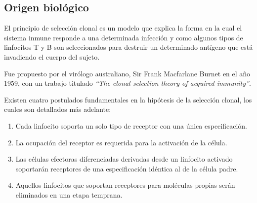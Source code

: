 
\subsection{Origen biológico}

El principio de selección clonal es un modelo que explica la forma en la cual el sistema inmune
responde a una determinada infección y como algunos tipos de linfocitos T y B son seleccionados
para destruir un determinado antígeno que está invadiendo el cuerpo del sujeto.

Fue propuesto por el virólogo australiano, Sir Frank Macfarlane Burnet en el año 1959,
con un trabajo titulado \emph{``The clonal selection theory of acquired immunity''}.

Existen cuatro postulados fundamentales en la hipótesis de la selección clonal, los cuales son detallados más adelante:
\begin{enumerate}
	\item Cada linfocito soporta un solo tipo de receptor con una única especificación.
	\item La ocupación del receptor es requerida para la activación de la célula.
	\item Las células efectoras diferenciadas derivadas desde un linfocito activado soportarán receptores de una especificación idéntica al de la célula padre.
	\item Aquellos linfocitos que soportan receptores para moléculas propias serán eliminados en una etapa temprana.
\end{enumerate}

